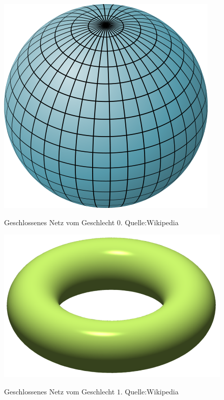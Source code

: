 \begin{figure}[H]
    \centering
    \includegraphics[scale=0.2]{images/Sphere.png}
    \label{fig:closed-mesh-gender0}
    \caption{Geschlossenes Netz vom Geschlecht $0$. Quelle:Wikipedia}
\end{figure}


\begin{figure}[H]
    \centering
    \includegraphics[scale=0.8]{images/Torus.png}
    \label{fig:closed-mesh-gender1}
    \caption{Geschlossenes Netz vom Geschlecht $1$. Quelle:Wikipedia}
\end{figure}


